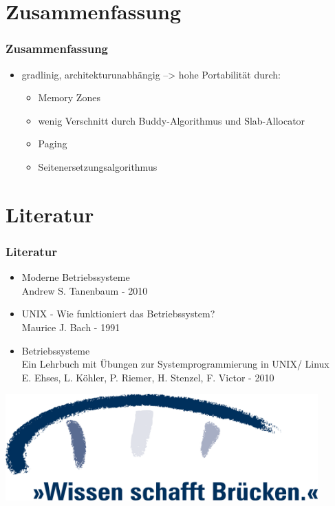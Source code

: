 \documentclass[ddcfooter,nosectionnum]{tudbeamer}
\begin{document}
\section{Zusammenfassung}
\begin{frame}
    \frametitle{Zusammenfassung}
    \begin{itemize}
    	\item gradlinig, architekturunabhängig --> hohe Portabilität durch:
		\begin{itemize}
			\item Memory Zones
			\item wenig Verschnitt durch Buddy-Algorithmus und Slab-Allocator 			\item Paging
			\item Seitenersetzungsalgorithmus
		\end{itemize}
	 \end{itemize}
    
\end{frame}


\section{Literatur}
\begin{frame}
    \frametitle{Literatur}
    \begin{itemize}
		\item  Moderne Betriebssysteme \\
        		Andrew S. Tanenbaum - 2010
		\item	 UNIX - Wie funktioniert das Betriebssystem? \\
		Maurice J. Bach - 1991
		\item Betriebssysteme\\
		Ein Lehrbuch mit Übungen zur Systemprogrammierung in UNIX/ Linux \\
		E. Ehses, L. Köhler, P. Riemer, H. Stenzel, F. Victor - 2010	
    \end{itemize}
\end{frame}

\begin{frame}
	\includegraphics[width= 0.9\textwidth]{br_logo_blau.png}
\end{frame}
\end{document}
